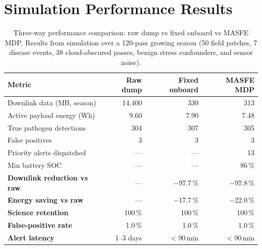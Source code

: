 \section*{Simulation Performance Results}
\label{appendix:results}

\begin{table}[htb]
  \centering
  \caption{Three-way performance comparison: raw dump vs fixed onboard vs MASFE MDP. Results from simulation over a 120-pass growing season (50 field patches, 7 disease events, 38 cloud-obscured passes, benign stress confounders, and sensor noise).}
  \small
  \begin{tabularx}{\textwidth}{Xrrr}
    \toprule
    \textbf{Metric} & \textbf{Raw dump} & \textbf{Fixed onboard} & \textbf{MASFE MDP} \\
    \midrule
    Downlink data (MB, season)      & 14{,}400 & 330   & 313 \\
    Active payload energy (Wh)      & 9.60     & 7.90  & 7.48 \\
    True pathogen detections        & 304      & 307   & 305 \\
    False positives                 & 3        & 3     & 3 \\
    Priority alerts dispatched      & ---      & ---   & 13  \\
    Min battery SOC                 & ---      & ---   & 86\,\% \\
    \midrule
    \textbf{Downlink reduction vs raw} & --- & $-$97.7\,\% & $-$97.8\,\% \\
    \textbf{Energy saving vs raw}      & --- & $-$17.7\,\% & $-$22.0\,\% \\
    \textbf{Science retention}         & 100\,\% & 100\,\% & 100\,\% \\
    \textbf{False-positive rate}       & 1.0\,\% & 1.0\,\% & 1.0\,\% \\
    \textbf{Alert latency}             & 1--3 days & $<$90\,min & $<$90\,min \\
    \bottomrule
  \end{tabularx}
\end{table}
